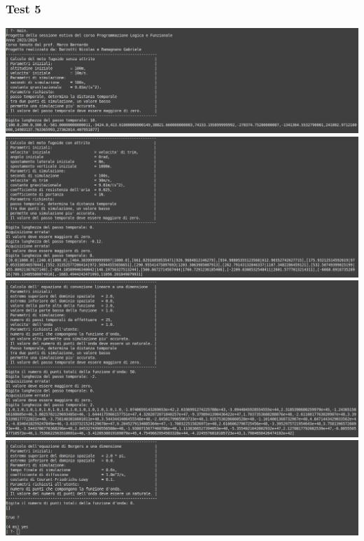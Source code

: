 \subsubsection*{Test 5}
\includegraphics[width=\textwidth,height=\textheight,keepaspectratio]{05_testing/image/pro/05_test/01.png}
\\
\includegraphics[width=\textwidth,height=\textheight,keepaspectratio]{05_testing/image/pro/05_test/02.png}
\\
\includegraphics[width=\textwidth,height=\textheight,keepaspectratio]{05_testing/image/pro/05_test/03.png}
\\
\includegraphics[width=\textwidth,height=\textheight,keepaspectratio]{05_testing/image/pro/05_test/04.png}

